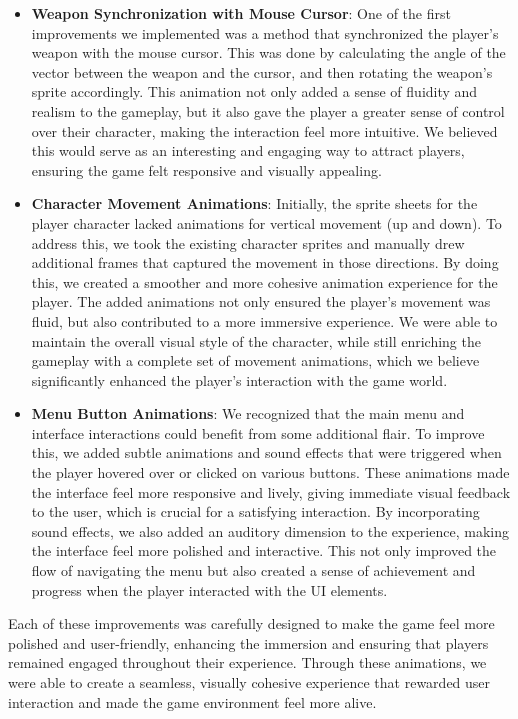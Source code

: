 \documentclass[a4paper,12pt]{article}
\begin{document}
\begin{itemize}
    \item \textbf{Weapon Synchronization with Mouse Cursor}: One of the first improvements we implemented was a method that synchronized the player's weapon with the mouse cursor. This was done by calculating the angle of the vector between the weapon and the cursor, and then rotating the weapon's sprite accordingly. This animation not only added a sense of fluidity and realism to the gameplay, but it also gave the player a greater sense of control over their character, making the interaction feel more intuitive. We believed this would serve as an interesting and engaging way to attract players, ensuring the game felt responsive and visually appealing.

    \item \textbf{Character Movement Animations}: Initially, the sprite sheets for the player character lacked animations for vertical movement (up and down). To address this, we took the existing character sprites and manually drew additional frames that captured the movement in those directions. By doing this, we created a smoother and more cohesive animation experience for the player. The added animations not only ensured the player’s movement was fluid, but also contributed to a more immersive experience. We were able to maintain the overall visual style of the character, while still enriching the gameplay with a complete set of movement animations, which we believe significantly enhanced the player's interaction with the game world.
    \item \textbf{Menu Button Animations}: We recognized that the main menu and interface interactions could benefit from some additional flair. To improve this, we added subtle animations and sound effects that were triggered when the player hovered over or clicked on various buttons. These animations made the interface feel more responsive and lively, giving immediate visual feedback to the user, which is crucial for a satisfying interaction. By incorporating sound effects, we also added an auditory dimension to the experience, making the interface feel more polished and interactive. This not only improved the flow of navigating the menu but also created a sense of achievement and progress when the player interacted with the UI elements.

\end{itemize}

Each of these improvements was carefully designed to make the game feel more polished and user-friendly, enhancing the immersion and ensuring that players remained engaged throughout their experience. Through these animations, we were able to create a seamless, visually cohesive experience that rewarded user interaction and made the game environment feel more alive.
\end{document}
